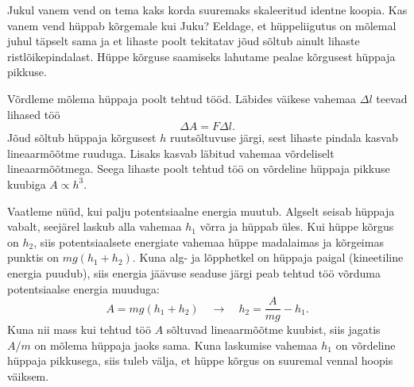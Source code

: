 
Jukul vanem vend on tema kaks korda suuremaks skaleeritud identne koopia. Kas vanem vend hüppab kõrgemale kui Juku? Eeldage, et hüppeliigutus on mõlemal juhul täpselt sama ja et lihaste poolt tekitatav jõud sõltub ainult lihaste ristlõikepindalast. Hüppe kõrguse saamiseks lahutame pealae kõrgusest hüppaja pikkuse.





\hint

\solu
Võrdleme mõlema hüppaja poolt tehtud tööd. Läbides väikese vahemaa $\Delta l$ teevad lihased töö
$$\Delta A = F \Delta l.$$
Jõud sõltub hüppaja kõrgusest $h$ ruutsõltuvuse järgi, sest lihaste pindala kasvab lineaarmõõtme ruuduga. Lisaks kasvab läbitud vahemaa võrdeliselt lineaarmõõtmega. Seega lihaste poolt tehtud töö on võrdeline hüppaja pikkuse kuubiga $A \propto h^3$.

Vaatleme nüüd, kui palju potentsiaalne energia muutub. Algselt seisab hüppaja vabalt, seejärel laskub alla vahemaa $h_1$ võrra ja hüppab üles. Kui hüppe kõrgus on $h_2$, siis potentsiaalsete energiate vahemaa hüppe madalaimas ja kõrgeimas punktis on $mg(h_1+h_2)$. Kuna alg- ja lõpphetkel on hüppaja paigal (kineetiline energia puudub), siis energia jäävuse seaduse järgi peab tehtud töö võrduma potentsiaalse energia muuduga:
$$A = mg(h_1+h_2) \quad\rightarrow\quad h_2 = \frac{A}{mg} - h_1.$$
Kuna nii mass kui tehtud töö $A$ sõltuvad lineaarmõõtme kuubist, siis jagatis $A/m$ on mõlema hüppaja jaoks sama. Kuna laskumise vahemaa $h_1$ on võrdeline hüppaja pikkusega, siis tuleb välja, et hüppe kõrgus on suuremal vennal hoopis väiksem.
\probend
